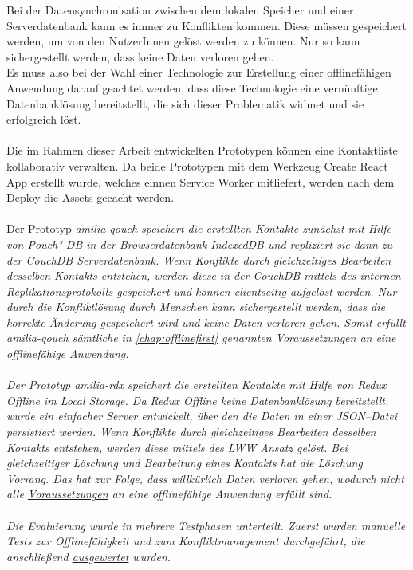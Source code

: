 Bei der Datensynchronisation zwischen dem lokalen Speicher und einer Serverdatenbank kann es immer zu Konflikten kommen.
Diese müssen gespeichert werden, um von den NutzerInnen gelöst werden zu können. Nur so kann sichergestellt werden, dass keine Daten verloren gehen.\\
Es muss also bei der Wahl einer Technologie zur Erstellung einer offlinefähigen Anwendung darauf geachtet werden, dass diese Technologie eine vernünftige Datenbanklösung bereitstellt, die sich dieser Problematik widmet und sie erfolgreich löst.\\\\
%
%
%
Die im Rahmen dieser Arbeit entwickelten Prototypen können eine Kontaktliste kollaborativ verwalten.
Da beide Prototypen mit dem Werkzeug Create React App erstellt wurde, welches einnen Service Worker mitliefert, werden nach dem Deploy die \gls{Assets} gecacht werden.\\\\
Der Prototyp \it{amilia-qouch} speichert die erstellten Kontakte zunächst mit Hilfe von Pouch"-DB in der Browserdatenbank IndexedDB und repliziert sie dann zu der CouchDB Serverdatenbank.
Wenn Konflikte durch gleichzeitiges Bearbeiten desselben Kontakts entstehen, werden diese in der CouchDB mittels des internen \hyperref[chap:replication]{Replikationsprotokolls} gespeichert und können clientseitig aufgelöst werden.
Nur durch die Konfliktlösung durch Menschen kann sichergestellt werden, dass die korrekte Änderung gespeichert wird und keine Daten verloren gehen.
Somit erfüllt \it{amilia-qouch} sämtliche in \autoref{chap:offlinefirst} genannten Voraussetzungen an eine offlinefähige Anwendung.\\\\
%
Der Prototyp \it{amilia-rdx} speichert die erstellten Kontakte mit Hilfe von Redux Offline im Local Storage.
Da Redux Offline keine Datenbanklösung bereitstellt, wurde ein einfacher Server entwickelt, über den die Daten in einer \gls{JSON}--Datei persistiert werden.
Wenn Konflikte durch gleichzeitiges Bearbeiten desselben Kontakts entstehen, werden diese mittels des \gls{LWW} Ansatz gelöst.
Bei gleichzeitiger Löschung und Bearbeitung eines Kontakts hat die Löschung Vorrang.
Das hat zur Folge, dass willkürlich Daten verloren gehen, wodurch nicht alle \hyperref[chap:offlinefirst]{Voraussetzungen} an eine offlinefähige Anwendung erfüllt sind.\\\\
%
%
Die Evaluierung wurde in mehrere Testphasen unterteilt. Zuerst wurden manuelle Tests zur Offlinefähigkeit und zum Konfliktmanagement durchgeführt, die anschließend \hyperref[chap:testauswertung]{ausgewertet} wurden.
